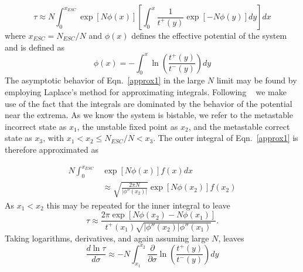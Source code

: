 \documentclass[aps,prl,twocolumn,showpacs,superscriptaddress,groupedaddress]{revtex4}
\begin{document}
\begin{equation}
\tau \approx N \int_{0}^{x_{ESC}} \exp\left[N\phi(x)\right] \left[ \int_{0}^{x} \frac{1}{t^+(y)}\exp\left[-N\phi(y)\right] dy \right] dx
\label{approx1}
\end{equation}
where $x_{ESC} = N_{ESC}/N$ and $\phi(x)$ defines the effective potential of the system and is defined as 
\begin{equation}
\phi(x) =  -\int_{0}^{x} \ln\left(\frac{t^+(y)}{t^-(y)}\right) dy
\label{potential}
\end{equation}
The asymptotic behavior of Eqn.~\ref{approx1} in the large $N$ limit may be found by employing Laplace's method for approximating integrals. Following ~\cite{vankampen} we make use of the fact that the integrals are dominated by the behavior of the potential near the extrema. As we know the system is bistable, we refer to the metastable incorrect state as $x_1$, the unstable fixed point as $x_2$, and the metastable correct state as $x_3$, with $x_1<x_2\le N_{ESC}/N < x_3$. The outer integral of Eqn.~\ref{approx1} is therefore approximated as

\begin{align}
N \int_{0}^{x_{ESC}} &\exp\left[N\phi(x)\right] f(x) dx    \nonumber \\ 
 &\approx \sqrt{\frac{2\pi N}{\vert \phi''(x_2) \vert}}  \exp\left[N\phi(x_2)\right] f(x_2) 
\label{laplace_out}
\end{align}
As $x_1<x_2$ this may be repeated for the inner integral to leave
\begin{equation}
\tau \approx  \frac{2\pi \exp\left[N \phi(x_2)-N \phi(x_1) \right] }{t^+(x_1)\sqrt{\vert \phi''(x_2) \vert \phi''(x_1)}}.
\label{laplace_approx}
\end{equation}
Taking logarithms, derivatives, and again assuming large $N$, leaves
\begin{equation}
  \frac{d \ln \tau}{d \sigma} \approx - N \int_{x_1}^{x_2} \frac{\partial}{\partial \sigma}\ln\left(\frac{t^+(y)}{t^-(y)}\right) dy
\label{laplace_cost}
\end{equation}
\end{document}
